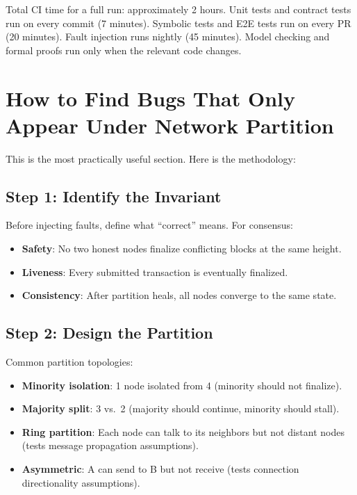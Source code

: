 \documentclass[11pt,a4paper]{article}
\begin{document}
Total CI time for a full run: approximately 2 hours. Unit tests and contract tests run
on every commit (7 minutes). Symbolic tests and E2E tests run on every PR (20 minutes).
Fault injection runs nightly (45 minutes). Model checking and formal proofs run only
when the relevant code changes.

\section{How to Find Bugs That Only Appear Under Network Partition}

This is the most practically useful section. Here is the methodology:

\subsection{Step 1: Identify the Invariant}

Before injecting faults, define what ``correct'' means. For consensus:
\begin{itemize}[nosep]
  \item \textbf{Safety}: No two honest nodes finalize conflicting blocks at the same height.
  \item \textbf{Liveness}: Every submitted transaction is eventually finalized.
  \item \textbf{Consistency}: After partition heals, all nodes converge to the same state.
\end{itemize}

\subsection{Step 2: Design the Partition}

Common partition topologies:
\begin{itemize}[nosep]
  \item \textbf{Minority isolation}: 1 node isolated from 4 (minority should not finalize).
  \item \textbf{Majority split}: 3 vs.\ 2 (majority should continue, minority should stall).
  \item \textbf{Ring partition}: Each node can talk to its neighbors but not distant nodes
    (tests message propagation assumptions).
  \item \textbf{Asymmetric}: A can send to B but not receive (tests connection
    directionality assumptions).
\end{itemize}
\end{document}
